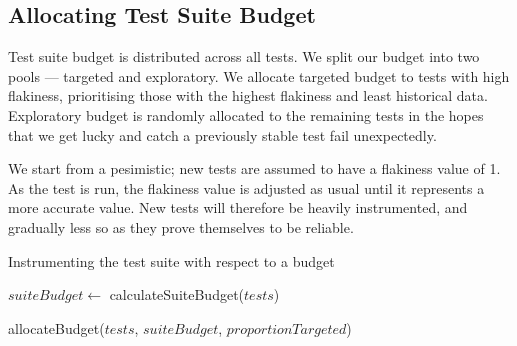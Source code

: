 
\subsection{Allocating Test Suite Budget}

Test suite budget is distributed across all tests. We split our budget into two pools --- targeted and exploratory. We allocate targeted budget to tests with high flakiness, prioritising those with the highest flakiness and least historical data. Exploratory budget is randomly allocated to the remaining tests in the hopes that we get lucky and catch a previously stable test fail unexpectedly.

We start from a pesimistic; new tests are assumed to have a flakiness value of 1. As the test is run, the flakiness value is adjusted as usual until it represents a more accurate value. New tests will therefore be heavily instrumented, and gradually less so as they prove themselves to be reliable.

\begin{algorithm}[h]
\caption{Instrumenting the test suite with respect to a budget}
\label{alg:splatter}
\begin{algorithmic}
	\Statex


	\State $suiteBudget \gets$ calculateSuiteBudget($tests$)
	\Statex

	\State allocateBudget($tests$, $suiteBudget$, $proportionTargeted$)
	\Statex

	\EndFor

	\EndFunction

	\Statex


	\Statex


	\EndFunction
\end{algorithmic}
\end{algorithm}


